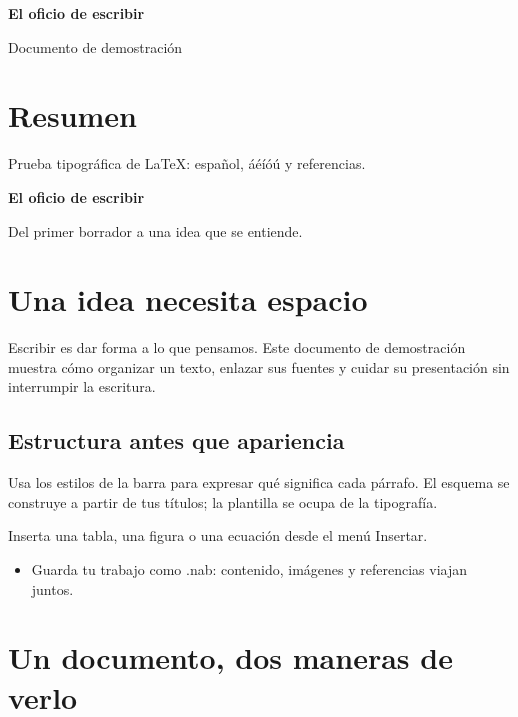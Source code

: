 \documentclass[12pt,a4paper,oneside,openany]{report}
\begin{document}
\begin{titlepage}\centering\vspace*{3cm}
{\LARGE\bfseries El oficio de escribir\par}
\vspace{1cm}\par
\vfill Documento de demostración\par \par 
\end{titlepage}
\chapter*{Resumen}
Prueba tipográfica de \LaTeX{}: español, áéíóú y referencias.
\fontsize{12.0}{14.399999999999999}\selectfont
{\LARGE\bfseries El oficio de escribir\par}

{\large Del primer borrador a una idea que se entiende.\par}

\chapter{Una idea necesita espacio}\label{bCD33CFA2-4EA7-424D-A9A4-1316C926B9C1}

Escribir es dar forma a lo que pensamos. Este documento de demostración muestra cómo organizar un texto, enlazar sus fuentes y cuidar su presentación sin interrumpir la escritura.

\section{Estructura antes que apariencia}\label{b42A30C3B-79B7-4763-B12B-D38E20288460}

Usa los estilos de la barra para expresar qué significa cada párrafo. El esquema se construye a partir de tus títulos; la plantilla se ocupa de la tipografía.

Inserta una tabla, una figura o una ecuación desde el menú Insertar.

\begin{itemize}
\item Guarda tu trabajo como .nab: contenido, imágenes y referencias viajan juntos.

\end{itemize}
\chapter{Un documento, dos maneras de verlo}\label{b855DE80F-B39D-450B-A65D-ADE6ABDDE005}
\end{document}
